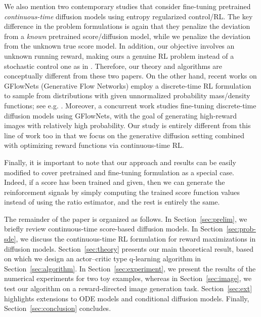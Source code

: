 \documentclass[11pt]{article}
\begin{document}
We also mention two contemporary  studies \citep{uehara2024fine, tang2024score} that consider fine-tuning  pretrained \textit{continuous-time} diffusion models using entropy regularized control/RL.
The key difference in the problem formulations is again that they penalize the deviation from a \textit{known} pretrained score/diffusion model, while we penalize the deviation from the unknown true score model.
In addition, our objective involves an unknown running reward, making ours a genuine  RL problem instead of a stochastic control one as in \cite{uehara2024fine}. Therefore, our theory and algorithms are conceptually different from these two papers. On the other hand, recent works on GFlowNets (Generative Flow Networks) employ a discrete-time RL formulation to  sample from distributions with given unnormalized probability mass/density functions; see e.g. \cite{bengio2023gflownet, lahlou2023theory, zhang2022unifying}. Moreover, a concurrent work \cite{zhang2024improving} studies fine-tuning discrete-time diffusion models using GFlowNets, with the goal of generating high-reward images with relatively high probability.
Our study is entirely different from this line of work too in that we focus on the generative diffusion setting combined with optimizing reward functions via continuous-time RL.

Finally, it is important to note that our approach and results can be easily modified to cover pretrained and fine-tuning
formulation as a special case. Indeed, if a score has been trained and given, then we can generate the reinforcement signals by simply computing the trained score function values instead of using the ratio estimator, and the rest is entirely the same. 

The remainder  of the paper is organized as follows. In Section~\ref{sec:prelim}, we briefly review continuous-time score-based diffusion models. In Section~\ref{sec:prob-sde}, we discuss the continuous-time RL formulation for reward maximizations in diffusion models. Section~\ref{sec:theory} presents our main theoretical result, based on which we design an actor--critic type q-learning algorithm in Section~\ref{sec:algorithm}. In Section~\ref{sec:experiment}, we present the results of the numerical experiments for two toy examples, whereas in Section~\ref{sec:image}, we test our algorithm on a reward-directed image generation task.
Section~\ref{sec:ext} highlights extensions to ODE models and conditional diffusion models. Finally, Section~\ref{sec:conclusion} concludes.


\end{document}
